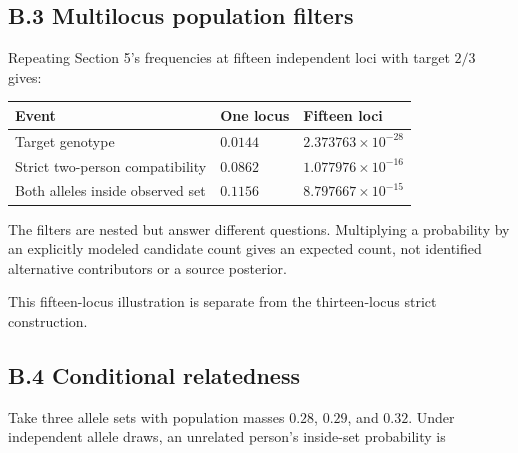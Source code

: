 \documentclass[
]{article}
\newcounter{none} %
\begin{document}
\subsection{B.3 Multilocus population
filters}\label{b.3-multilocus-population-filters}

Repeating Section 5's frequencies at fifteen independent loci with
target \(2/3\) gives:

{\def\LTcaptype{none} %
\begin{longtable}[]{@{}
  >{\raggedright\arraybackslash}p{}
  >{\raggedleft\arraybackslash}p{}
  >{\raggedleft\arraybackslash}p{}@{}}
\toprule\noalign{}
\begin{minipage}[b]{\linewidth}\raggedright
Event
\end{minipage} & \begin{minipage}[b]{\linewidth}\raggedleft
One locus
\end{minipage} & \begin{minipage}[b]{\linewidth}\raggedleft
Fifteen loci
\end{minipage} \\
\midrule\noalign{}
\endhead
\bottomrule\noalign{}
\endlastfoot
Target genotype & \(0.0144\) & \(2.373763\times10^{-28}\) \\
Strict two-person compatibility & \(0.0862\) &
\(1.077976\times10^{-16}\) \\
Both alleles inside observed set & \(0.1156\) &
\(8.797667\times10^{-15}\) \\
\end{longtable}
}

The filters are nested but answer different questions. Multiplying a
probability by an explicitly modeled candidate count gives an expected
count, not identified alternative contributors or a source posterior.

This fifteen-locus illustration is separate from the thirteen-locus
strict construction.

\subsection{B.4 Conditional
relatedness}\label{b.4-conditional-relatedness}

Take three allele sets with population masses \(0.28\), \(0.29\), and
\(0.32\). Under independent allele draws, an unrelated person's
inside-set probability is
\end{document}
